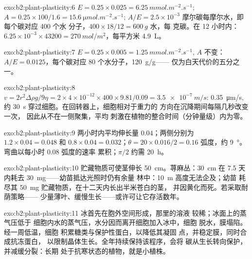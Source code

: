 \begin{solution}{exo:b2:plant-plasticity:6}
$E = 0.25\times 0.025 = \qty{6.25}{mmol.m^{-2}.s^{-1}}$; $A =
0.25\times 100/1.6 = \qty{15.6}{\micro mol.m^{-2}.s^{-1}}$; $A/E =
2.5\times 10^{-3}$ 摩尔碳每摩尔水，即每个碳对应 400 个水
分子，$400\times 18/12 = \qty{600}{g}$ 水，每
克碳。在 12 小时内：$6.25\times 10^{-3}\times 43200 =
\qty{270}{mol/m^2}$，每平方米 \qty{4.9}{L}。
\end{solution}

\begin{solution}{exo:b2:plant-plasticity:7}
$E = 0.25\times 0.005 = \qty{1.25}{mmol.m^{-2}.s^{-1}}$, $A$
不变：$A/E = 0.0125$，每个碳对应 80 个水分子，\qty{120}{g/g}——
仅为白天代价的五分之一。
\end{solution}

\begin{solution}{exo:b2:plant-plasticity:8}
$v = 2r^{2}\Delta\rho g/9\eta = 2\times 4\times 10^{-12}\times
400\times 9.81/0.09 = \qty{3.5e-7}{m/s}$: \qty{0.35}{\micro m/s},
约 \qty{30}{s} 穿过细胞。在回转器上，细胞相对于重力的
方向在沉降期间每隔几秒改变一次，
因此从不在一侧聚集，平均
刺激在植物的整合时间（分钟量级）内为零。
\end{solution}

\begin{solution}{exo:b2:plant-plasticity:9}
两小时内平均伸长量 $0.04$；两侧分别为 $1.2\times 0.04 = 0.048$
和 $0.8\times 0.04 = 0.032$；$\theta = 20\times 0.016/2 = 0.16$
弧度，约 \qty{9}{\degree}。弯曲以每小时 $0.08$ 弧度的速率
累积；$\pi/2$ 约需 \qty{20}{h}。
\end{solution}

\begin{solution}{exo:b2:plant-plasticity:10}
贮藏物质可使茎伸长 \qty{50}{cm}。荨麻丛：\qty{30}{cm}
在 7.5 天内耗去 \qty{30}{mg}——幼苗抵达光照时仍有余量
林中：\qty{10}{m} 高度无法企及；幼苗
耗尽其 \qty{50}{mg} 贮藏物质，在十二天内长出半米苍白的茎，
并因黄化而死。若采取耐荫策略——
少量薄叶、缓慢生长——或许可让它存活数年。
\end{solution}

\begin{solution}{exo:b2:plant-plasticity:11}
冰首先在胞外空间形成，那里的溶液
较稀；冰面上的蒸气压低于
细胞内水的蒸气压，水分因而离开细胞加入冰中，细胞
脱水，膜塌陷。经一周低温，细胞
积累糖类与保护性蛋白，以降低其凝固
点，并稳定膜，同时合成抗冻蛋白，
以限制晶体生长。全年持续保持该程序，会将
碳从生长转向保护，并减缓分裂：长期
处于抗寒状态的植物，就是小植株。
\end{solution}

